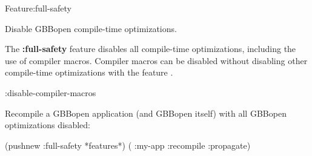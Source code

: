 \documentclass[10pt,twoside,english,pdftex]{article}
\begin{document}

\begin{functiondoc}{Feature}{:full-safety}{}%
%
%
%

\fnsyntax

\fnpurpose Disable GBBopen compile-time optimizations.

\fndescription
%
The \textbf{:full-safety} feature disables all compile-time optimizations,
including the use of compiler macros.  Compiler macros can be disabled without
disabling other compile-time optimizations with the feature
.

\begin{alsos}{:disable-compiler-macros}
\also[defcm]
\end{alsos}

\fnexample
{}%
%
%
Recompile a GBBopen application (and GBBopen itself) with all GBBopen
optimizations disabled:
%
\W\supp
\begin{example}
  (pushnew :full-safety *features*)
  ( :my-app :recompile :propagate)
\end{example}

\end{functiondoc}

\end{document}
